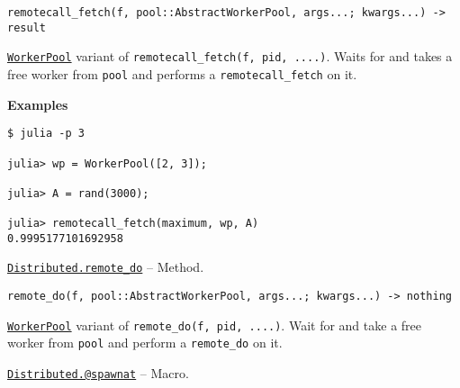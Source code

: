 \begin{adjustwidth}{2em}{0pt}


\begin{verbatim}
remotecall_fetch(f, pool::AbstractWorkerPool, args...; kwargs...) -> result
\end{verbatim}

\hyperlink{17976394752057970100}{\texttt{WorkerPool}} variant of \texttt{remotecall\_fetch(f, pid, ....)}. Waits for and takes a free worker from \texttt{pool} and performs a \texttt{remotecall\_fetch} on it.

\textbf{Examples}


\begin{verbatim}
$ julia -p 3

julia> wp = WorkerPool([2, 3]);

julia> A = rand(3000);

julia> remotecall_fetch(maximum, wp, A)
0.9995177101692958
\end{verbatim}



\end{adjustwidth}
\hypertarget{4977553935697188594}{}
\hyperlink{4977553935697188594}{\texttt{Distributed.remote\_do}}  -- {Method.}

\begin{adjustwidth}{2em}{0pt}


\begin{verbatim}
remote_do(f, pool::AbstractWorkerPool, args...; kwargs...) -> nothing
\end{verbatim}

\hyperlink{17976394752057970100}{\texttt{WorkerPool}} variant of \texttt{remote\_do(f, pid, ....)}. Wait for and take a free worker from \texttt{pool} and perform a \texttt{remote\_do} on it.



\end{adjustwidth}
\hypertarget{11231712027010946923}{}
\hyperlink{11231712027010946923}{\texttt{Distributed.@spawnat}}  -- {Macro.}

